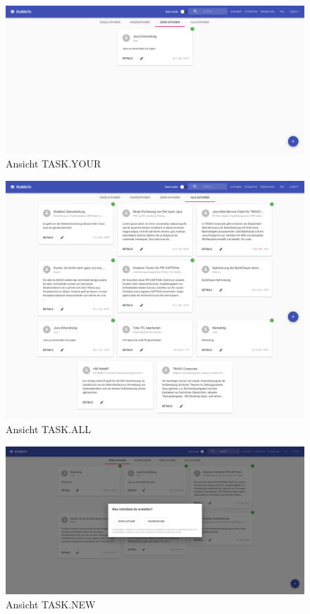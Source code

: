 \documentclass[
  12pt,
  ngerman,
  a4paper,
]{article}
\begin{document}
\begin{figure}
\centering
\includegraphics{./tex2pdf.-c803d322dfea80aa/108f3c537d8035b8bdc8a1058ba8f82610771530.png}
\caption{Ansicht TASK.YOUR}
\end{figure}

\begin{figure}
\centering
\includegraphics{./tex2pdf.-c803d322dfea80aa/da9ee686dc2d8ad97ac31e5253caf99016a4e3f5.png}
\caption{Ansicht TASK.ALL}
\end{figure}

\begin{figure}
\centering
\includegraphics{./tex2pdf.-c803d322dfea80aa/303dcfe459fd3b8446fc3094f7aa678a2a72eef0.png}
\caption{Ansicht TASK.NEW}
\end{figure}
\end{document}

